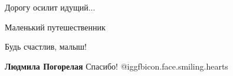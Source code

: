  
 
 
 
 

Дорогу осилит идущий...

Маленький путешественник

Будь счастлив, малыш!

\textbf{Людмила Погорелая} Спасибо! @igg{fbicon.face.smiling.hearts} 
